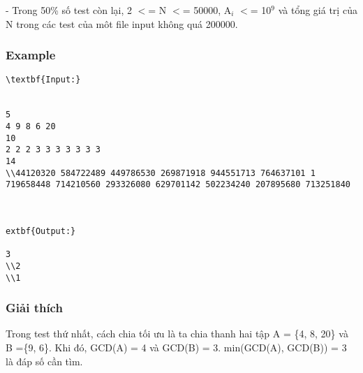 - Trong 50\% số test còn lại, 2 $<$= N $<$= 50000, A$_i$ $<$= 10$^9$ và tổng giá trị của N trong các test của môt file input không quá 200000.

\subsubsection{Example}
\begin{verbatim}
\textbf{Input:}


5 
4 9 8 6 20 
10 
2 2 2 3 3 3 3 3 3 3 
14 
\\44120320 584722489 449786530 269871918 944551713 764637101 1 719658448 714210560 293326080 629701142 502234240 207895680 713251840



extbf{Output:}

3
\\2
\\1 \end{verbatim}

\subsubsection{Giải thích}

Trong test thứ nhất, cách chia tối ưu là ta chia thanh hai tập A = \{4, 8, 20\} và B =\{9, 6\}. Khi đó, GCD(A) = 4 và GCD(B) = 3. min(GCD(A), GCD(B)) = 3 là đáp số cần tìm.
